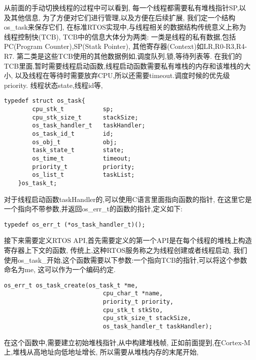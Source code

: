从前面的手动切换线程的过程中可以看到,
每一个线程都需要私有堆栈指针SP,以及其他信息, 
为了方便对它们进行管理,以及方便在后续扩展,
我们定一个结构os\_task来保存它们,
在标准RTOS实现中,与线程相关的数据结构传统意义上称为线程控制快(TCB),
TCB中的信息大体分为两类:
一类是线程的私有数据,包括PC(Program Counter),SP(Statk Pointer),
其他寄存器(Context)如LR,R0-R3,R4-R7.
第二类是这些TCB使用的其他数据例如,调度队列,锁,等待列表等.
在我们的TCB里面,暂时需要线程启动函数,线程启动函数需要私有堆栈的内存和该堆栈的大小,
以及线程在等待时需要放弃CPU,所以还需要timeout.调度时候的优先级priority.
线程状态state,线程id等,
\begin{lstlisting}[language={[ANSI]C},keywordstyle=\color{blue!70},commentstyle=\color{red!50!green!50!blue!50},frame=shadowbox, rulesepcolor=\color{red!20!green!20!blue!20}]
    typedef struct os_task{
        cpu_stk_t 		    sp;
        cpu_stk_size_t 		stackSize;
        os_task_handler_t   taskHandler;
        os_task_id_t 	    id;
        os_obj_t            obj;
        task_state_t 		state;
        os_time_t 		    timeout;
        priority_t 		    priority;
        os_list_t           taskList;
    }os_task_t;
\end{lstlisting}
对于线程启动函数taskHandler的,可以使用C语言里面指向函数的指针,
在这里它是一个指向不带参数,并返回os\_err\_t的函数的指针,定义如下:
\begin{lstlisting}[language={[ANSI]C},keywordstyle=\color{blue!70},commentstyle=\color{red!50!green!50!blue!50},frame=shadowbox, rulesepcolor=\color{red!20!green!20!blue!20}]
    typedef os_err_t (*os_task_handler_t)();
\end{lstlisting}
接下来需要定义RTOS API,首先需要定义的第一个API是在每个线程的堆栈上构造寄存器上下文的函数,
传统上,这种RTOS服务称之为线程创建或者线程启动,
我们使用os\_task\_开始,这个函数需要以下参数:一个指向TCB的指针,可以将这个参数命名为me,
这可以作为一个编码约定.
\begin{lstlisting}[language={[ANSI]C},keywordstyle=\color{blue!70},commentstyle=\color{red!50!green!50!blue!50},frame=shadowbox, rulesepcolor=\color{red!20!green!20!blue!20}]
    os_err_t os_task_create(os_task_t *me,
                            cpu_char_t *name, 
                            priority_t priority, 
                            cpu_stk_t stkSto, 
                            cpu_stk_size_t stackSize, 
                            os_task_handler_t taskHandler);
\end{lstlisting}
在这个函数中,需要建立初始堆栈指针,从中构建堆栈帧,
正如前面提到,在Cortex-M上,堆栈从高地址向低地址增长,
所以需要从堆栈内存的末尾开始,
